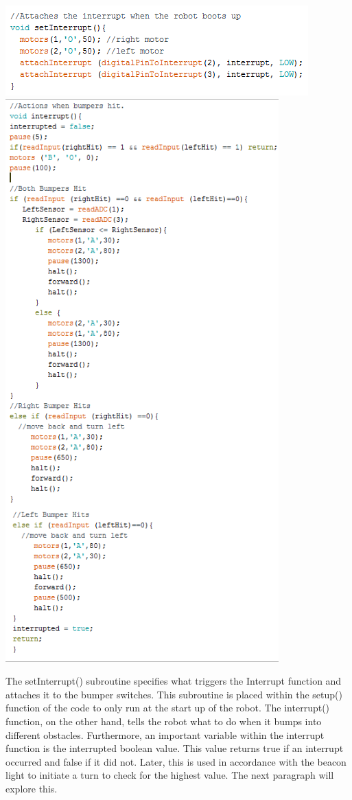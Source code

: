 \documentclass{article}
\begin{document}
     \begin{center}
    \includegraphics[]{setInterrupt.png}\\
    \includegraphics[]{Interrupt.png}
    \end{center}
    
    The setInterrupt() subroutine specifies what triggers the Interrupt function and attaches it to the bumper switches. This subroutine is placed within the setup() function of the code to only run at the start up of the robot. The interrupt() function, on the other hand, tells the robot what to do when it bumps into different obstacles. Furthermore, an important variable within the interrupt function is the interrupted boolean value. This value returns true if an interrupt occurred and false if it did not. Later, this is used in accordance with the beacon light to initiate a turn to check for the highest value. The next paragraph will explore this.
    
\end{document}
